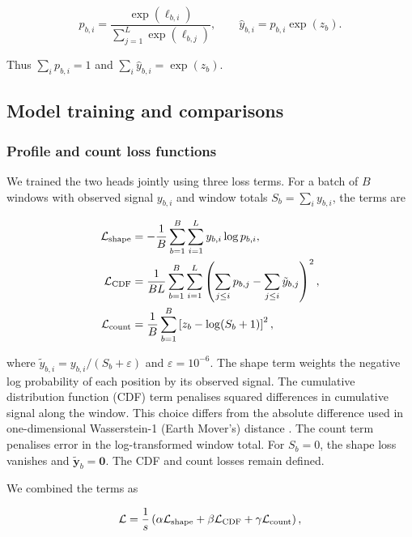 \documentclass[webpdf,contemporary,large]{current_assets/oup-authoring-template}
\begin{document}
\begin{equation}
p_{b,i}=\frac{\exp(\ell_{b,i})}{\sum_{j=1}^{L}\exp(\ell_{b,j})},
\qquad \hat y_{b,i}=p_{b,i}\exp(z_b).
\label{eq:dual_head_decode}
\end{equation}

Thus $\sum_i p_{b,i}=1$ and $\sum_i\hat y_{b,i}=\exp(z_b)$.

\subsection{Model training and comparisons}\label{sec:impl}

\subsubsection{Profile and count loss functions}\label{subsec:loss}

We trained the two heads jointly using three loss terms. For a batch of $B$ windows with observed signal $y_{b,i}$ and window totals $S_b=\sum_i y_{b,i}$, the terms are

\begin{align}
\mathcal L_{\rm shape}
&=-\frac1B\sum_{b=1}^{B}\sum_{i=1}^{L}y_{b,i}\log p_{b,i},
\label{eq:shape_loss}\\
\mathcal L_{\rm CDF}
&=\frac1{BL}\sum_{b=1}^{B}\sum_{i=1}^{L}
\left(\sum_{j\leq i}p_{b,j}-\sum_{j\leq i}\tilde y_{b,j}\right)^2,
\label{eq:cdf_loss}\\
\mathcal L_{\rm count}
&=\frac1B\sum_{b=1}^{B}\left[z_b-\log(S_b+1)\right]^2,
\label{eq:main_count_loss}
\end{align}

where $\tilde y_{b,i}=y_{b,i}/(S_b+\varepsilon)$ and $\varepsilon=10^{-6}$. The shape term weights the negative log probability of each position by its observed signal. The cumulative distribution function (CDF) term penalises squared differences in cumulative signal along the window. This choice differs from the absolute difference used in one-dimensional Wasserstein-1 (Earth Mover's) distance \citep{rubner2000emd}. The count term penalises error in the log-transformed window total. For $S_b=0$, the shape loss vanishes and $\tilde{\mathbf y}_b=\mathbf0$. The CDF and count losses remain defined.

We combined the terms as

\begin{equation}
\mathcal L=\frac1s
\left(\alpha\mathcal L_{\rm shape}+
\beta\mathcal L_{\rm CDF}+\gamma\mathcal L_{\rm count}\right),
\label{eq:total_loss}
\end{equation}
\end{document}
